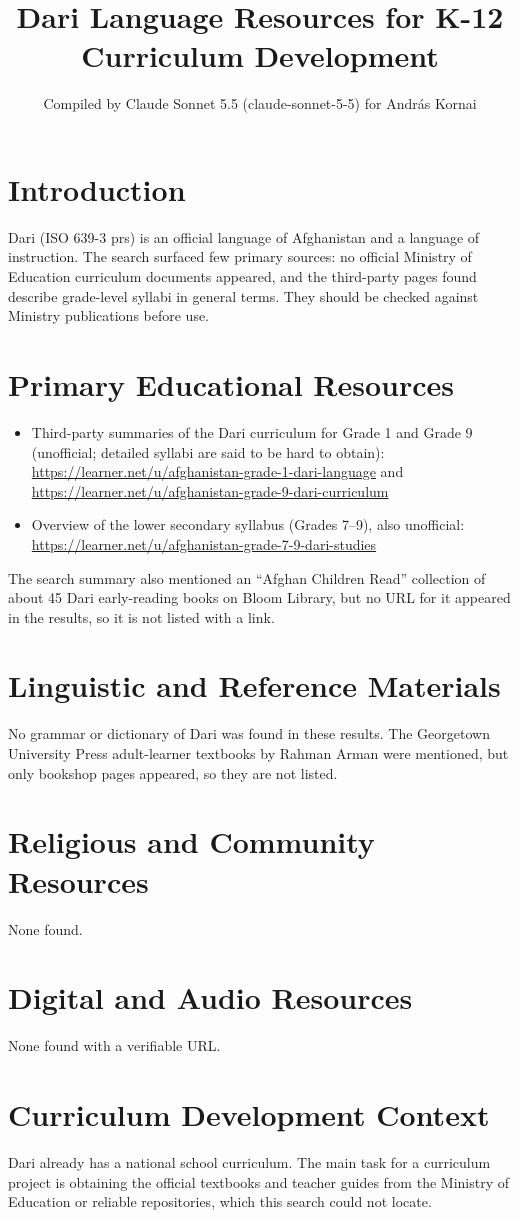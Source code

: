 \documentclass[12pt]{article}
\title{Dari Language Resources for K-12 Curriculum Development}
\author{Compiled by Claude Sonnet 5.5 (claude-sonnet-5-5) for Andr\'as Kornai}
\date{}
\begin{document}
\maketitle

\section{Introduction}
Dari (ISO 639-3 prs) is an official language of Afghanistan and a language of instruction. The search surfaced few primary sources: no official Ministry of Education curriculum documents appeared, and the third-party pages found describe grade-level syllabi in general terms. They should be checked against Ministry publications before use.

\section{Primary Educational Resources}
\begin{itemize}
\item Third-party summaries of the Dari curriculum for Grade 1 and Grade 9 (unofficial; detailed syllabi are said to be hard to obtain): \url{https://learner.net/u/afghanistan-grade-1-dari-language} and \url{https://learner.net/u/afghanistan-grade-9-dari-curriculum}
\item Overview of the lower secondary syllabus (Grades 7--9), also unofficial: \url{https://learner.net/u/afghanistan-grade-7-9-dari-studies}
\end{itemize}
The search summary also mentioned an ``Afghan Children Read'' collection of about 45 Dari early-reading books on Bloom Library, but no URL for it appeared in the results, so it is not listed with a link.

\section{Linguistic and Reference Materials}
No grammar or dictionary of Dari was found in these results. The Georgetown University Press adult-learner textbooks by Rahman Arman were mentioned, but only bookshop pages appeared, so they are not listed.

\section{Religious and Community Resources}
None found.

\section{Digital and Audio Resources}
None found with a verifiable URL.

\section{Curriculum Development Context}
Dari already has a national school curriculum. The main task for a curriculum project is obtaining the official textbooks and teacher guides from the Ministry of Education or reliable repositories, which this search could not locate.
\end{document}
